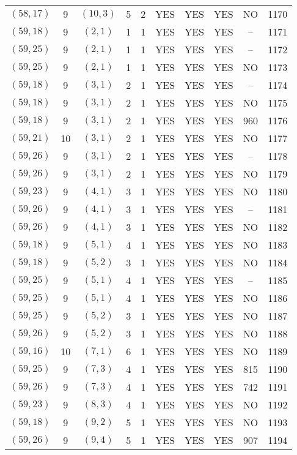 \begin{longtable}{|c|c|c|c|c|c|c|c|c|c|}
$(58, 17)$ & 9 & $(10, 3)$ & 5 & 2 & YES & YES & YES & NO & 1170\\
$(59, 18)$ & 9 & $(2, 1)$ & 1 & 1 & YES & YES & YES & -- & 1171\\
$(59, 25)$ & 9 & $(2, 1)$ & 1 & 1 & YES & YES & YES & -- & 1172\\
$(59, 25)$ & 9 & $(2, 1)$ & 1 & 1 & YES & YES & YES & NO & 1173\\
$(59, 18)$ & 9 & $(3, 1)$ & 2 & 1 & YES & YES & YES & -- & 1174\\
$(59, 18)$ & 9 & $(3, 1)$ & 2 & 1 & YES & YES & YES & NO & 1175\\
$(59, 18)$ & 9 & $(3, 1)$ & 2 & 1 & YES & YES & YES & 960 & 1176\\
$(59, 21)$ & 10 & $(3, 1)$ & 2 & 1 & YES & YES & YES & NO & 1177\\
$(59, 26)$ & 9 & $(3, 1)$ & 2 & 1 & YES & YES & YES & -- & 1178\\
$(59, 26)$ & 9 & $(3, 1)$ & 2 & 1 & YES & YES & YES & NO & 1179\\
$(59, 23)$ & 9 & $(4, 1)$ & 3 & 1 & YES & YES & YES & NO & 1180\\
$(59, 26)$ & 9 & $(4, 1)$ & 3 & 1 & YES & YES & YES & -- & 1181\\
$(59, 26)$ & 9 & $(4, 1)$ & 3 & 1 & YES & YES & YES & NO & 1182\\
$(59, 18)$ & 9 & $(5, 1)$ & 4 & 1 & YES & YES & YES & NO & 1183\\
$(59, 18)$ & 9 & $(5, 2)$ & 3 & 1 & YES & YES & YES & NO & 1184\\
$(59, 25)$ & 9 & $(5, 1)$ & 4 & 1 & YES & YES & YES & -- & 1185\\
$(59, 25)$ & 9 & $(5, 1)$ & 4 & 1 & YES & YES & YES & NO & 1186\\
$(59, 25)$ & 9 & $(5, 2)$ & 3 & 1 & YES & YES & YES & NO & 1187\\
$(59, 26)$ & 9 & $(5, 2)$ & 3 & 1 & YES & YES & YES & NO & 1188\\
$(59, 16)$ & 10 & $(7, 1)$ & 6 & 1 & YES & YES & YES & NO & 1189\\
$(59, 25)$ & 9 & $(7, 3)$ & 4 & 1 & YES & YES & YES & 815 & 1190\\
$(59, 26)$ & 9 & $(7, 3)$ & 4 & 1 & YES & YES & YES & 742 & 1191\\
$(59, 23)$ & 9 & $(8, 3)$ & 4 & 1 & YES & YES & YES & NO & 1192\\
$(59, 18)$ & 9 & $(9, 2)$ & 5 & 1 & YES & YES & YES & NO & 1193\\
$(59, 26)$ & 9 & $(9, 4)$ & 5 & 1 & YES & YES & YES & 907 & 1194\\

\end{longtable}
